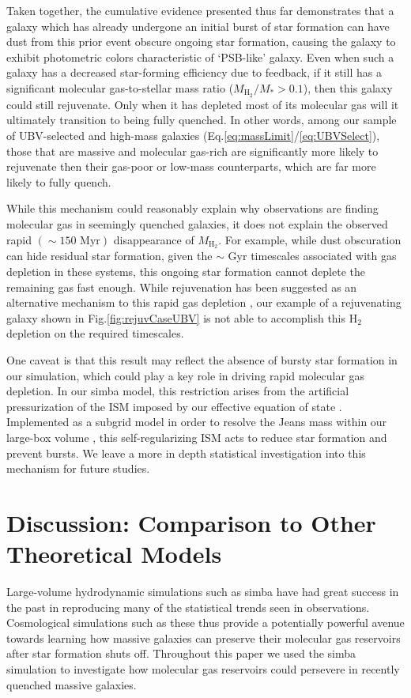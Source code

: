 \documentclass[twocolumn, linenumbers]{aastex631}
\newcommand{\mhh}{M_{\text{H}_2}}
\newcommand{\eq}{Eq.\hspace{.2em}}
\renewcommand{\fig}{Fig.\hspace{.2em}}
\newcommand{\simba}[0]{{\sc simba} }
\begin{document}
Taken together, the cumulative evidence presented thus far demonstrates that a galaxy which has already undergone an initial burst of star formation can have dust from this prior event obscure ongoing star formation, causing the galaxy to exhibit photometric colors characteristic of `PSB-like' galaxy.  Even when such a galaxy has a decreased star-forming efficiency due to feedback, if it still has a significant molecular gas-to-stellar mass ratio ($\mhh/M_*>0.1$), then this galaxy could still rejuvenate.  Only when it has depleted most of its molecular gas will it ultimately transition to being fully quenched.  In other words, among our sample of UBV-selected and high-mass galaxies (\eq \ref{eq:massLimit}/\ref{eq:UBVSelect}), those that are massive and molecular gas-rich are significantly more likely to rejuvenate then their gas-poor or low-mass counterparts, which are far more likely to fully quench.

While this mechanism could reasonably explain why observations are finding molecular gas in seemingly quenched galaxies, it does not explain the observed rapid $(\sim150 \text{ Myr})$ disappearance of $\mhh$.  For example, while dust obscuration can hide residual star formation, given the $\sim$ Gyr timescales associated with gas depletion in these systems, this ongoing star formation cannot deplete the remaining gas fast enough.  While rejuvenation has been suggested as an alternative mechanism to this rapid gas depletion \citep{setton2025}, our example of a rejuvenating galaxy shown in \fig\ref{fig:rejuvCaseUBV} is not able to accomplish this H$_2$ depletion on the required timescales.  

One caveat is that this result may reflect the absence of bursty star formation in our simulation, which could play a key role in driving rapid molecular gas depletion.  In our \simba model, this restriction arises from the artificial pressurization of the ISM imposed by our effective equation of state \citep{simba}.  Implemented as a subgrid model in order to resolve the Jeans mass within our large-box volume \citep{mufasa}, this self-regularizing ISM acts to reduce star formation and prevent bursts.  We leave a more in depth statistical investigation into this mechanism for future studies.

\newcommand{\firebox}[0]{{\sc FIREbox} }
\newcommand{\fire}[0]{{\sc fire}}
\newcommand{\cenci}[0]{\cite{cenci25} }
\section{Discussion: Comparison to Other Theoretical Models}
\label{sec:discussion}
Large-volume hydrodynamic simulations such as \simba have had great success in the past in reproducing many of the statistical trends seen in observations.  Cosmological simulations such as these thus provide a potentially powerful avenue towards learning how massive galaxies can preserve their molecular gas reservoirs after star formation shuts off.  Throughout this paper we used the \simba simulation to investigate how molecular gas reservoirs could persevere in recently quenched massive galaxies.  
\end{document}
